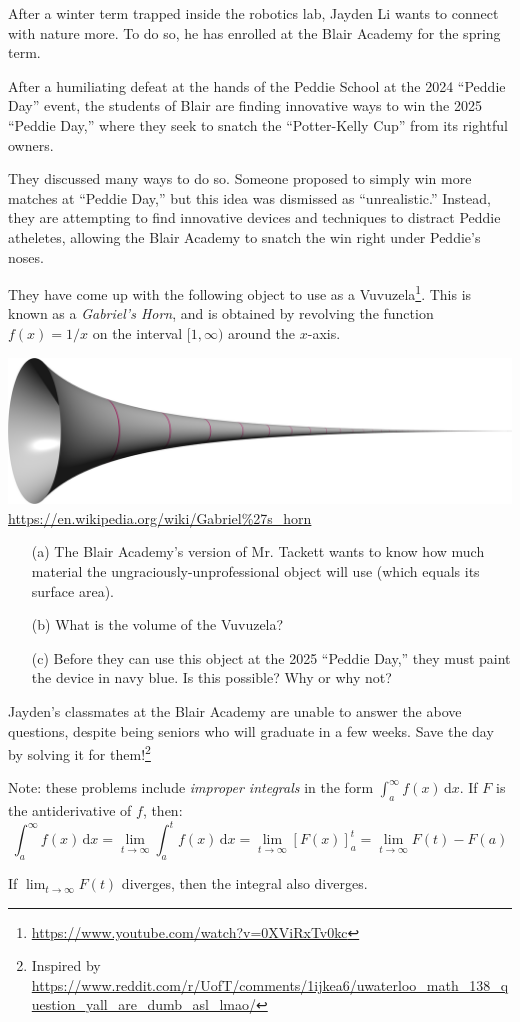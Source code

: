 \documentclass{article}
\begin{document}
After a winter term trapped inside the robotics lab, Jayden Li wants to connect with nature more. To do so, he has enrolled at the Blair Academy for the spring term.

After a humiliating defeat at the hands of the Peddie School at the 2024 ``Peddie Day'' event, the students of Blair are finding innovative ways to win the 2025 ``Peddie Day,'' where they seek to snatch the ``Potter-Kelly Cup'' from its rightful owners.

They discussed many ways to do so. Someone proposed to simply win more matches at ``Peddie Day,'' but this idea was dismissed as ``unrealistic.'' Instead, they are attempting to find innovative devices and techniques to distract Peddie atheletes, allowing the Blair Academy to snatch the win right under Peddie's noses.

They have come up with the following object to use as a Vuvuzela\footnote{\url{https://www.youtube.com/watch?v=0XViRxTv0kc}}. This is known as a \textit{Gabriel's Horn}, and is obtained by revolving the function $f(x)=1/x$ on the interval $[1,\infty)$ around the $x$-axis.

\begin{center}
	\includegraphics[width=0.8\linewidth]{GabrielHorn.png}
	\url{https://en.wikipedia.org/wiki/Gabriel%27s_horn}
\end{center}

\begin{itemize}[topsep=0pt]
	\item[(a)] The Blair Academy's version of Mr. Tackett wants to know how much material the ungraciously-unprofessional object will use (which equals its surface area).
	\item[(b)] What is the volume of the Vuvuzela?
	\item[(c)] Before they can use this object at the 2025 ``Peddie Day,'' they must paint the device in navy blue. Is this possible? Why or why not?
\end{itemize}

Jayden's classmates at the Blair Academy are unable to answer the above questions, despite being seniors who will graduate in a few weeks. Save the day by solving it for them!\footnote{Inspired by \url{https://www.reddit.com/r/UofT/comments/1ijkea6/uwaterloo_math_138_question_yall_are_dumb_asl_lmao/}}

Note: these problems include \textit{improper integrals} in the form $\displaystyle \int_{a}^{\infty}f(x)\,\mathrm{d}x$. If $F$ is the antiderivative of $f$, then:
\begin{equation*}
    \int_{a}^{\infty}f(x)\,\mathrm{d}x
	=\lim_{t\to\infty}\int_{a}^{t}f(x)\,\mathrm{d}x
	=\lim_{t\to\infty}\left[F(x)\right]_{a}^{t}
	=\lim_{t\to\infty}F(t)-F(a)
\end{equation*}

If $\lim_{t\to\infty}F(t)$ diverges, then the integral also diverges.
\end{document}
